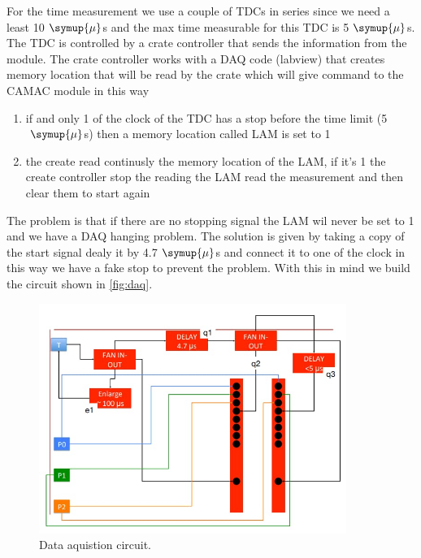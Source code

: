 For the time measurement we use a couple of TDCs in series since we need a least 10$\;\symup{\mu}$s
and the max time measurable for this TDC is 5$\;\symup{\mu}$s.
The TDC is controlled by a crate controller that sends the information 
from the module. The crate controller works with a DAQ code (labview) 
that creates memory location that will be read by the crate which will give command to the
CAMAC module in this way
\begin{enumerate}
  \item if and only 1 of the clock of the TDC has a stop before the time limit (5$\;\symup{\mu}$s) then a memory location called LAM is set to 1
  \item  the create read continusly the memory location of the LAM, if it's 1 the create controller stop the reading the LAM read the measurement and then clear them to start again
\end{enumerate}
 The problem is that if there are no stopping signal the LAM wil never be set to 1 and we
  have a DAQ hanging problem. The solution is given by taking a copy of the start signal
dealy it by 4.7$\;\symup{\mu}$s and connect it to one of the clock in this way we have
a fake stop to prevent the problem. With this in mind we build the circuit shown in \autoref{fig:daq}.\\
\begin{figure}[h]
\begin{center}
\includegraphics[width=100mm]{figures/cattura4.png}
\end{center}
\caption{Data aquistion circuit.}
\label{fig:daq}
\end{figure}

